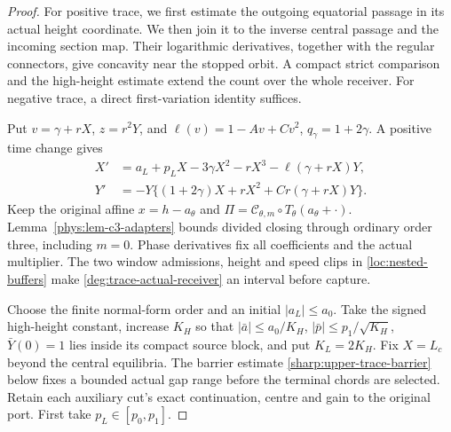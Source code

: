 \begin{proof}
For positive trace, we first estimate the outgoing equatorial passage
in its actual height coordinate. We then join it to the inverse central
passage and the incoming section map. Their logarithmic derivatives,
together with the regular connectors, give concavity near the stopped
orbit. A compact strict comparison and the high-height estimate extend
the count over the whole receiver. For negative trace, a direct
first-variation identity suffices.

Put \(v=\gamma+rX\), \(z=r^2Y\), and
\(\ell(v)=1-Av+Cv^2\), \(q_\gamma=1+2\gamma\). A positive time change gives
\begin{equation}\label{deg:trace-field}
\begin{split}
 X'&=a_L+p_LX-3\gamma X^2-rX^3-\ell(\gamma+rX)Y,\\
 Y'&=-Y\{(1+2\gamma)X+rX^2+Cr(\gamma+rX)Y\}.
\end{split}
\end{equation}
Keep the original affine \(x=h-a_\theta\) and
\(\Pi=\mathcal C_{\theta,m}\circ T_\theta(a_\theta+\cdot)\).
Lemma~\ref{phys:lem-c3-adapters} bounds divided closing through
ordinary order three, including \(m=0\). Phase derivatives fix all
coefficients and the actual multiplier. The two window admissions,
height and speed clips in \eqref{loc:nested-buffers} make
\eqref{deg:trace-actual-receiver} an interval before capture.

Choose the finite normal-form order and an initial \(|a_L|\le a_0\).
Take the signed high-height constant, increase \(K_H\) so that
\(|\bar a|\le a_0/K_H\), \(|\bar p|\le p_1/\sqrt{K_H}\),
\(\bar Y(0)=1\) lies inside its compact source block, and put
\(K_L=2K_H\). Fix \(X=L_c\) beyond the central equilibria.
The barrier estimate \eqref{sharp:upper-trace-barrier} below fixes a
bounded actual gap range before the terminal chords are selected.
Retain each auxiliary cut's exact continuation, centre and gain to
the original port. First take \(p_L\in[p_0,p_1]\).


\end{proof}
